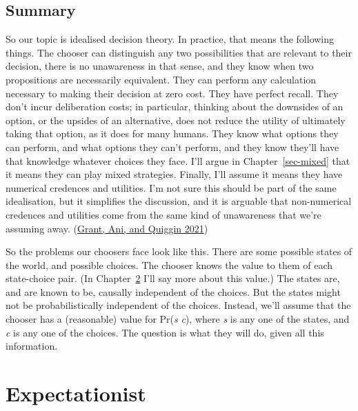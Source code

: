 \documentclass[
  12pt,
  letterpaper,
  DIV=11,
  numbers=noendperiod]{scrreprt}
\begin{document}
\hypertarget{sec-ideal-summary}{%
\section{Summary}\label{sec-ideal-summary}}

So our topic is idealised decision theory. In practice, that means the
following things. The chooser can distinguish any two possibilities that
are relevant to their decision, there is no unawareness in that sense,
and they know when two propositions are necessarily equivalent. They can
perform any calculation necessary to making their decision at zero cost.
They have perfect recall. They don't incur deliberation costs; in
particular, thinking about the downsides of an option, or the upsides of
an alternative, does not reduce the utility of ultimately taking that
option, as it does for many humans. They know what options they can
perform, and what options they can't perform, and they know they'll have
that knowledge whatever choices they face. I'll argue in
Chapter~\ref{sec-mixed} that it means they can play mixed strategies.
Finally, I'll assume it means they have numerical credences and
utilities. I'm not sure this should be part of the same idealisation,
but it simplifies the discussion, and it is arguable that non-numerical
credences and utilities come from the same kind of unawareness that
we're assuming away. (\protect\hyperlink{ref-GrantEtAl2021}{Grant, Ani,
and Quiggin 2021})

So the problems our choosers face look like this. There are some
possible states of the world, and possible choices. The chooser knows
the value to them of each state-choice pair. (In
Chapter~\ref{sec-expect} I'll say more about this value.) The states
are, and are known to be, causally independent of the choices. But the
states might not be probabilistically independent of the choices.
Instead, we'll assume that the chooser has a (reasonable) value for
Pr(\emph{s} \textbar{} \emph{c}), where \emph{s} is any one of the
states, and \emph{c} is any one of the choices. The question is what
they will do, given all this information.


\hypertarget{sec-expect}{%
\chapter{Expectationist}\label{sec-expect}}
\end{document}
